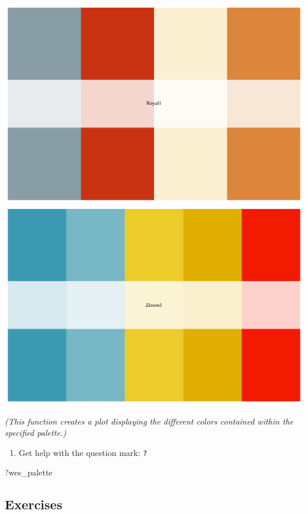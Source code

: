 \documentclass[
]{book}
\newenvironment{Shaded}{\begin{snugshade}}{\end{snugshade}}
\newcommand{\NormalTok}[1]{#1}
\providecommand{\tightlist}{%
  \setlength{\itemsep}{0pt}\setlength{\parskip}{0pt}}
\begin{document}
\includegraphics[width=694.08px]{figures/unnamed-chunk-138-1} \includegraphics[width=694.08px]{figures/unnamed-chunk-138-2}

\emph{(This function creates a plot displaying the different colors contained within the specified palette.)}

\begin{enumerate}
\def\labelenumi{\arabic{enumi}.}
\setcounter{enumi}{3}
\tightlist
\item
  Get help with the question mark: \texttt{?}
\end{enumerate}

\begin{Shaded}
\begin{Highlighting}[]
\NormalTok{?wes\_palette}
\end{Highlighting}
\end{Shaded}

\hypertarget{exercises-4}{%
\subsection*{Exercises}\label{exercises-4}}
\end{document}

